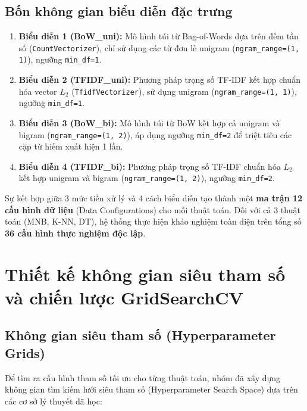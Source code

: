 \subsection{Bốn không gian biểu diễn đặc trưng}
\begin{enumerate}
    \item \textbf{Biểu diễn 1 (BoW\_uni):} Mô hình túi từ Bag-of-Words dựa trên đếm tần số (\texttt{CountVectorizer}), chỉ sử dụng các từ đơn lẻ unigram (\texttt{ngram\_range=(1, 1)}), ngưỡng \texttt{min\_df=1}.
    \item \textbf{Biểu diễn 2 (TFIDF\_uni):} Phương pháp trọng số TF-IDF kết hợp chuẩn hóa vector $L_2$ (\texttt{TfidfVectorizer}), sử dụng unigram (\texttt{ngram\_range=(1, 1)}), ngưỡng \texttt{min\_df=1}.
    \item \textbf{Biểu diễn 3 (BoW\_bi):} Mô hình túi từ BoW kết hợp cả unigram và bigram (\texttt{ngram\_range=(1, 2)}), áp dụng ngưỡng \texttt{min\_df=2} để triệt tiêu các cặp từ hiếm xuất hiện 1 lần.
    \item \textbf{Biểu diễn 4 (TFIDF\_bi):} Phương pháp trọng số TF-IDF chuẩn hóa $L_2$ kết hợp unigram và bigram (\texttt{ngram\_range=(1, 2)}), ngưỡng \texttt{min\_df=2}.
\end{enumerate}

Sự kết hợp giữa 3 mức tiền xử lý và 4 cách biểu diễn tạo thành một \textbf{ma trận 12 cấu hình dữ liệu} (Data Configurations) cho mỗi thuật toán. Đối với cả 3 thuật toán (MNB, K-NN, DT), hệ thống thực hiện khảo nghiệm toàn diện trên tổng số \textbf{36 cấu hình thực nghiệm độc lập}.

\section{Thiết kế không gian siêu tham số và chiến lược GridSearchCV}
\label{sec:thiet-ke-gridsearch}

\subsection{Không gian siêu tham số (Hyperparameter Grids)}
Để tìm ra cấu hình tham số tối ưu cho từng thuật toán, nhóm đã xây dựng không gian tìm kiếm lưới siêu tham số (Hyperparameter Search Space) dựa trên các cơ sở lý thuyết đã học:


